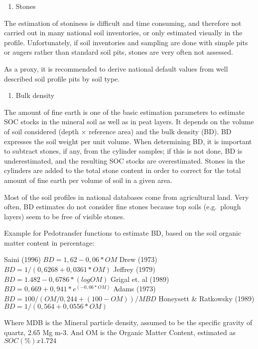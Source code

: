 \documentclass[]{book}
\providecommand{\tightlist}{%
  \setlength{\itemsep}{0pt}\setlength{\parskip}{0pt}}
\theoremstyle{definition}
\theoremstyle{definition}
\theoremstyle{definition}
\theoremstyle{remark}
\begin{document}
\begin{enumerate}
\def\labelenumi{\alph{enumi})}
\tightlist
\item
  Stones
\end{enumerate}

The estimation of stoniness is difficult and time consuming, and
therefore not carried out in many national soil inventories, or only
estimated visually in the profile. Unfortunately, if soil inventories
and sampling are done with simple pits or augers rather than standard
soil pits, stones are very often not assessed.

As a proxy, it is recommended to derive national default values from
well described soil profile pits by soil type.

\begin{enumerate}
\def\labelenumi{\alph{enumi})}
\setcounter{enumi}{1}
\tightlist
\item
  Bulk density
\end{enumerate}

The amount of fine earth is one of the basic estimation parameters to
estimate SOC stocks in the mineral soil as well as in peat layers. It
depends on the volume of soil considered (depth × reference area) and
the bulk density (BD). BD expresses the soil weight per unit volume.
When determining BD, it is important to subtract stones, if any, from
the cylinder samples; if this is not done, BD is underestimated, and the
resulting SOC stocks are overestimated. Stones in the cylinders are
added to the total stone content in order to correct for the total
amount of fine earth per volume of soil in a given area.

Most of the soil profiles in national databases come from agricultural
land. Very often, BD estimates do not consider fine stones because top
soils (e.g.~plough layers) seem to be free of visible stones.

Example for Pedotransfer functions to estimate BD, based on the soil
organic matter content in percentage:

Saini (1996) \(BD = 1,62-0,06 * OM\) Drew (1973)
\(BD = 1/(0,6268 + 0,0361 * OM)\) Jeffrey (1979)
\(BD = 1.482 - 0,6786 * (log OM)\) Grigal et. al (1989)
\(BD = 0,669 + 0,941* e ^(-0,06 * OM)\) Adams (1973)
\(BD = 100/(OM/0,244 + (100-OM))/MBD\) Honeysett \& Ratkowsky (1989)\\
\(BD = 1/(0,564 + 0,0556*OM)\)

Where MDB is the Mineral particle density, assumed to be the specific
gravity of quartz, 2.65 Mg m-3. And OM is the Organic Matter Content,
estimated as \(SOC(\%) x 1.724\)
\end{document}

